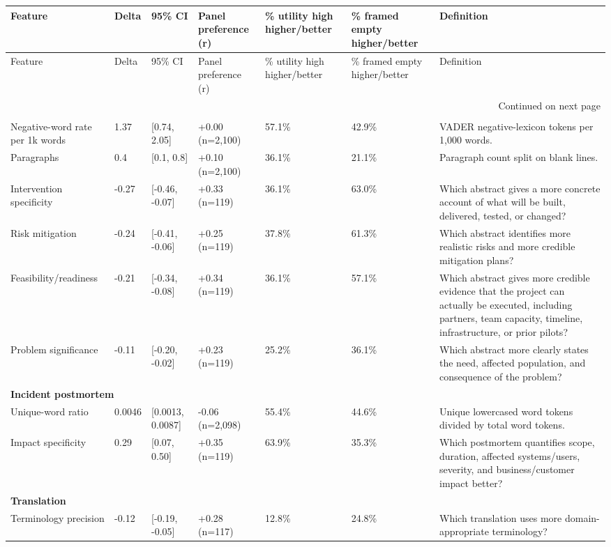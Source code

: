 \begin{longtable}{lllllll}
\toprule
Feature & Delta & 95\% CI & Panel preference (r) & \% utility high higher/better & \% framed empty higher/better & Definition \\
\midrule
\endfirsthead
\toprule
Feature & Delta & 95\% CI & Panel preference (r) & \% utility high higher/better & \% framed empty higher/better & Definition \\
\midrule
\endhead
\midrule
\multicolumn{7}{r}{Continued on next page} \\
\midrule
\endfoot
\bottomrule
\endlastfoot
\multicolumn{7}{l}{\textbf{Grant abstract}} \\
Negative-word rate per 1k words & 1.37 & [0.74, 2.05] & +0.00 (n=2,100) & 57.1\% & 42.9\% & VADER negative-lexicon tokens per 1,000 words. \\
Paragraphs & 0.4 & [0.1, 0.8] & +0.10 (n=2,100) & 36.1\% & 21.1\% & Paragraph count split on blank lines. \\
Intervention specificity & -0.27 & [-0.46, -0.07] & +0.33 (n=119) & 36.1\% & 63.0\% & Which abstract gives a more concrete account of what will be built, delivered, tested, or changed? \\
Risk mitigation & -0.24 & [-0.41, -0.06] & +0.25 (n=119) & 37.8\% & 61.3\% & Which abstract identifies more realistic risks and more credible mitigation plans? \\
Feasibility/readiness & -0.21 & [-0.34, -0.08] & +0.34 (n=119) & 36.1\% & 57.1\% & Which abstract gives more credible evidence that the project can actually be executed, including partners, team capacity, timeline, infrastructure, or prior pilots? \\
Problem significance & -0.11 & [-0.20, -0.02] & +0.23 (n=119) & 25.2\% & 36.1\% & Which abstract more clearly states the need, affected population, and consequence of the problem? \\
\multicolumn{7}{l}{\textbf{Incident postmortem}} \\
Unique-word ratio & 0.0046 & [0.0013, 0.0087] & -0.06 (n=2,098) & 55.4\% & 44.6\% & Unique lowercased word tokens divided by total word tokens. \\
Impact specificity & 0.29 & [0.07, 0.50] & +0.35 (n=119) & 63.9\% & 35.3\% & Which postmortem quantifies scope, duration, affected systems/users, severity, and business/customer impact better? \\
\multicolumn{7}{l}{\textbf{Translation}} \\
Terminology precision & -0.12 & [-0.19, -0.05] & +0.28 (n=117) & 12.8\% & 24.8\% & Which translation uses more domain-appropriate terminology? \\
\end{longtable}

